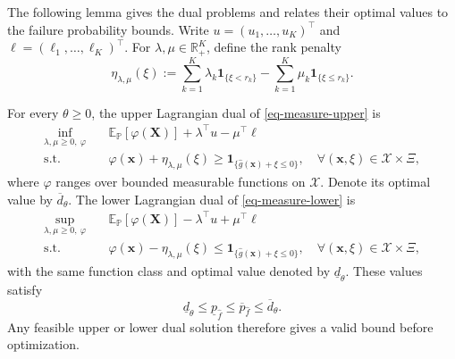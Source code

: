 The following lemma gives the dual problems and relates their optimal values to the failure probability bounds. Write $u=(u_1,\ldots,u_K)^\top$ and $\ell=(\ell_1,\ldots,\ell_K)^\top$. For $\lambda,\mu\in\mathbb R_+^K$, define the rank penalty
\begin{equation}
  \eta_{\lambda,\mu}(\xi):=
  \sum_{k=1}^K\lambda_k\mathbf1_{\{\xi<r_k\}}
  -\sum_{k=1}^K\mu_k\mathbf1_{\{\xi\le r_k\}}.
  \label{eq-dual-step-function}
\end{equation}

\begin{lemma}
  \label{lem-weak-duality}
  For every $\theta\ge0$, the upper Lagrangian dual of \eqref{eq-measure-upper} is
  \begin{equation}
    \begin{aligned}
      \inf_{\lambda,\mu\ge0,\ \varphi}\quad&
      \mathbb E_{\mathbb P}\left[\varphi(\bm X)\right]+\lambda^\top u-\mu^\top\ell\\
      \text{s.t.}\quad&
      \varphi(\bm x)+\eta_{\lambda,\mu}(\xi)\ge\mathbf1_{\{\hat g(\bm x)+\xi\le0\}},
      \quad\forall(\bm x,\xi)\in\mathcal X\times\Xi,
    \end{aligned}
    \label{eq-upper-measure-dual}
  \end{equation}
  where $\varphi$ ranges over bounded measurable functions on $\mathcal X$. Denote its optimal value by $\overline d_\theta$. The lower Lagrangian dual of \eqref{eq-measure-lower} is
  \begin{equation}
    \begin{aligned}
      \sup_{\lambda,\mu\ge0,\ \varphi}\quad&
      \mathbb E_{\mathbb P}\left[\varphi(\bm X)\right]-\lambda^\top u+\mu^\top\ell\\
      \text{s.t.}\quad&
      \varphi(\bm x)-\eta_{\lambda,\mu}(\xi)\le\mathbf1_{\{\hat g(\bm x)+\xi\le0\}},
      \quad\forall(\bm x,\xi)\in\mathcal X\times\Xi,
    \end{aligned}
    \label{eq-lower-measure-dual}
  \end{equation}
  with the same function class and optimal value denoted by $\underline d_\theta$. These values satisfy
  \begin{equation}
    \underline d_\theta\le\underline p_{\hat f}\le\overline p_{\hat f}\le\overline d_\theta.
    \label{eq-weak-duality}
  \end{equation}
  Any feasible upper or lower dual solution therefore gives a valid bound before optimization.
\end{lemma}

